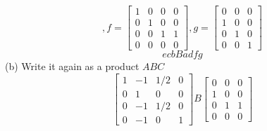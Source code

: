 \documentclass[12pt]{article}
\numberwithin{equation}{section}
\begin{document}
\begin{enumerate}
$$    ,f=\left[\begin{array}{cccc}1&0&0&0\\0&1&0&0\\0&0&1&1\\0&0&0&0\end{array}\right],g=\left[\begin{array}{ccc}0&0&0\\1&0&0\\0&1&0\\0&0&1\end{array}\right]$$
    $$ecbBadfg$$
    (b) Write it again as a product $ABC$\\
    $$\left[\begin{array}{cccc}1&-1&1/2&0\\0&1&0&0\\0&-1&1/2&0\\0&-1&0&1\end{array}\right]B\left[\begin{array}{ccc}0&0&0\\1&0&0\\0&1&1\\0&0&0\end{array}\right]$$


\end{enumerate}
\end{document}
